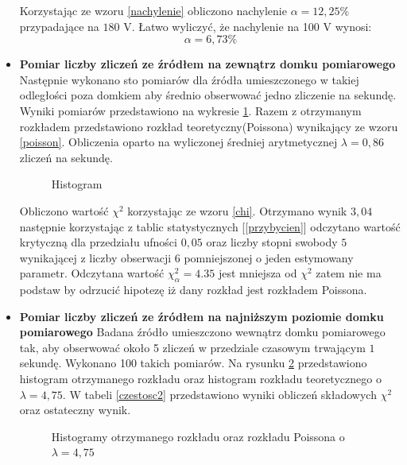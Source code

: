 \documentclass{article}
\begin{document}
\begin{itemize}
Korzystając ze wzoru \ref{nachylenie} obliczono nachylenie $\alpha = 12,25 \%$ przypadające na $180$ V. Łatwo wyliczyć, że nachylenie na 100 V wynosi:
\begin{equation*}
	\alpha = 6,73 \%
\end{equation*}
\item \textbf{Pomiar liczby zliczeń ze źródłem na zewnątrz domku pomiarowego}\\
Następnie wykonano sto pomiarów dla źródła umieszczonego w takiej odległości poza domkiem aby średnio obserwować jedno zliczenie na sekundę. Wyniki pomiarów przedstawiono na wykresie \ref{hist1}. Razem z otrzymanym rozkładem przedstawiono rozkład teoretyczny(Poissona) wynikający ze wzoru \ref{poisson}. Obliczenia oparto na wyliczonej średniej arytmetycznej $\lambda = 0,86$ zliczeń na sekundę.
\begin{figure}[h!]
	\fontsize{6}{8}\selectfont %
	\centering
	\resizebox{0.9\textwidth}{!}{}	
	
	\caption{Histogram}
	\label{hist1}
\end{figure}

Obliczono wartość $\chi^2$ korzystając ze wzoru \ref{chi}. Otrzymano wynik $3,04$ następnie korzystając z tablic statystycznych [\ref{przybycien}] odczytano wartość krytyczną dla przedziału ufności $0,05$ oraz liczby stopni swobody $5$ wynikającej z liczby obserwacji $6$ pomniejszonej o jeden estymowany parametr. Odczytana wartość $\chi^2_\alpha = 4.35 $ jest mniejsza od $\chi^2$ zatem nie ma podstaw by odrzucić hipotezę iż dany rozkład jest rozkładem Poissona.

\item \textbf{Pomiar liczby zliczeń ze źródłem na najniższym poziomie domku pomiarowego}
Badana źródło umieszczono wewnątrz domku pomiarowego tak, aby obserwować około 5 zliczeń w przedziale czasowym trwającym $1$ sekundę. Wykonano 100 takich pomiarów. Na rysunku \ref{hist2} przedstawiono histogram otrzymanego rozkładu oraz histogram rozkładu teoretycznego o $\lambda = 4,75$. W tabeli \ref{czestosc2} przedstawiono wyniki obliczeń składowych $\chi^2$ oraz ostateczny wynik.


\begin{figure}[h!]
	\fontsize{6}{8}\selectfont %
	\centering
	\resizebox{0.8\textwidth}{!}{}
	
	\caption{Histogramy otrzymanego rozkładu oraz rozkładu Poissona o $\lambda = 4,75$}
	\label{hist2}
\end{figure}



\end{itemize}
\end{document}
